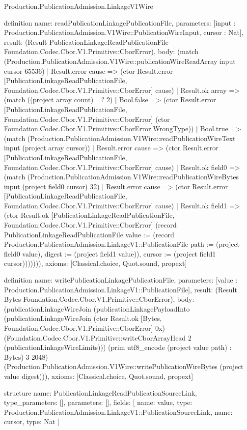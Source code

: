 \begin{lexlean}{Production.PublicationAdmission.LinkageV1Wire}
\begin{semanticmodule}
definition{
  name: readPublicationLinkagePublicationFile,
  parameters: [input : Production.PublicationAdmission.V1Wire::PublicationWireInput, cursor : Nat],
  result: (Result PublicationLinkageReadPublicationFile Foundation.Codec.Cbor.V1.Primitive::CborError),
  body: (match (Production.PublicationAdmission.V1Wire::publicationWireReadArray input cursor 65536)
    | Result.error cause => (ctor Result.error [PublicationLinkageReadPublicationFile, Foundation.Codec.Cbor.V1.Primitive::CborError] cause)
    | Result.ok array => (match ((project array count) =? 2)
      | Bool.false => (ctor Result.error [PublicationLinkageReadPublicationFile, Foundation.Codec.Cbor.V1.Primitive::CborError] (ctor Foundation.Codec.Cbor.V1.Primitive::CborError.WrongType))
      | Bool.true => (match (Production.PublicationAdmission.V1Wire::readPublicationWireText input (project array cursor))
        | Result.error cause => (ctor Result.error [PublicationLinkageReadPublicationFile, Foundation.Codec.Cbor.V1.Primitive::CborError] cause)
        | Result.ok field0 => (match (Production.PublicationAdmission.V1Wire::readPublicationWireBytes input (project field0 cursor) 32)
          | Result.error cause => (ctor Result.error [PublicationLinkageReadPublicationFile, Foundation.Codec.Cbor.V1.Primitive::CborError] cause)
          | Result.ok field1 => (ctor Result.ok [PublicationLinkageReadPublicationFile, Foundation.Codec.Cbor.V1.Primitive::CborError] (record PublicationLinkageReadPublicationFile {value := (record Production.PublicationAdmission.LinkageV1::PublicationFile {path := (project field0 value), digest := (project field1 value)}), cursor := (project field1 cursor)})))))),
  axioms: [Classical.choice, Quot.sound, propext]
}

definition{
  name: writePublicationLinkagePublicationFile,
  parameters: [value : Production.PublicationAdmission.LinkageV1::PublicationFile],
  result: (Result Bytes Foundation.Codec.Cbor.V1.Primitive::CborError),
  body: (publicationLinkageWireJoin (publicationLinkagePayloadInto (publicationLinkageWireJoin (ctor Result.ok [Bytes, Foundation.Codec.Cbor.V1.Primitive::CborError] 0x) (Foundation.Codec.Cbor.V1.Primitive::writeCborArrayHead 2 (publicationLinkageWireLimits))) (prim utf8_encode (project value path) : Bytes) 3 2048) (Production.PublicationAdmission.V1Wire::writePublicationWireBytes (project value digest))),
  axioms: [Classical.choice, Quot.sound, propext]
}

structure{
  name: PublicationLinkageReadPublicationSourceLink,
  type_parameters: [],
  parameters: [],
  fields: [
    {name: value, type: Production.PublicationAdmission.LinkageV1::PublicationSourceLink},
    {name: cursor, type: Nat}
  ]
}


\end{semanticmodule}
\end{lexlean}
